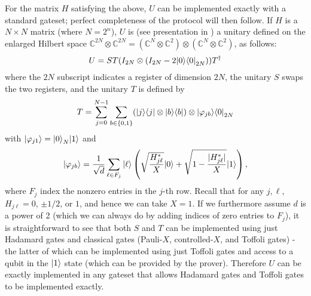 \documentclass[11pt]{article}
\theoremstyle{definition}
\theoremstyle{remark}
\begin{document}
For the matrix $H$ satisfying the above, $U$ can be implemented exactly with a standard gateset; perfect completeness of the protocol will then follow. If $H$ is a $N \times N$ matrix (where $N=2^n$), $U$ is (see presentation in \cite[Section~3.1~and~Lemma~10]{berry15}) a unitary defined on the enlarged Hilbert space $\mathbb{C}^{2N} \otimes \mathbb{C}^{2N} = (\mathbb{C}^{N} \otimes \mathbb{C}^2) \otimes  (\mathbb{C}^{N} \otimes \mathbb{C}^2)$, as follows:
\begin{equation}
U = ST(I_{2N} \otimes (I_{2N} - 2{\left\vert{0}\right\rangle}{\left\langle{0}\right\vert}_{2N})) T^\dagger
\end{equation}
where the $2N$ subscript indicates a register of dimension $2N$, the unitary $S$ swaps the two registers, and the unitary $T$ is defined by
\begin{equation}
T = \sum_{j=0}^{N-1}\sum_{b \in \{0,1\}} ({\left\vert{j}\right\rangle}{\left\langle{j}\right\vert} \otimes {\left\vert{b}\right\rangle}{\left\langle{b}\right\vert}) \otimes {\left\vert{\varphi_{jb}}\right\rangle}{\left\langle{0}\right\vert}_{2N}
\end{equation}
with ${\left\vert{\varphi_{j1}}\right\rangle} = {\left\vert{0}\right\rangle}_N{\left\vert{1}\right\rangle}$ and
\begin{equation}
{\left\vert{\varphi_{jb}}\right\rangle} = \frac{1}{\sqrt{d}} \sum_{\ell \in F_j} {\left\vert{\ell}\right\rangle}\left(\sqrt{\frac{H^*_{j\ell}}{X}}{\left\vert{0}\right\rangle} + \sqrt{1-\frac{|H^*_{j\ell}|}{X}}{\left\vert{1}\right\rangle}\right),
\end{equation}
where $F_j$ index the nonzero entries in the $j$-th row. Recall that for any $j,\ell$, $H_{j\ell}=0$, $\pm 1/2$, or $1$, and hence we can take $X=1$. If we furthermore assume $d$ is a power of 2 (which we can always do by adding indices of zero entries to $F_j$), it is straightforward to see that both $S$ and $T$ can be implemented using just Hadamard gates and classical gates (Pauli-$X$, controlled-$X$, and Toffoli gates) - the latter of which can be implemented using just Toffoli gates and access to a qubit in the ${\left\vert{1}\right\rangle}$ state (which can be provided by the prover). Therefore $U$ can be exactly implemented in any gateset that allows Hadamard gates and Toffoli gates to be implemented exactly.
\end{document}
